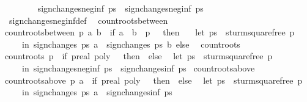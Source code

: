 \begin{isabellebody}
\ \ \ \ \ \ \isamarkupfalse%
\ {\isachardoublequoteopen}sign{\isacharunderscore}changes{\isacharunderscore}neg{\isacharunderscore}inf\ ps{\isacharprime}\ {\isacharequal}\ sign{\isacharunderscore}changes{\isacharunderscore}neg{\isacharunderscore}inf\ ps{\isachardoublequoteclose}\isanewline
\ \ \ \ \ \ \isamarkupfalse%
\ sign{\isacharunderscore}changes{\isacharunderscore}neg{\isacharunderscore}inf{\isacharunderscore}def\ \isacommand{{\isachardot}}\isamarkupfalse%
\isanewline
{}\isamarkupfalse%
%
\endisatagproof
{\isafoldproof}%
%
\isadelimproof
%
\endisadelimproof
%
\isamarkuptrue%
\isamarkupfalse%
\ count{\isacharunderscore}roots{\isacharunderscore}between\ \isanewline
{\isachardoublequoteopen}count{\isacharunderscore}roots{\isacharunderscore}between\ p\ a\ b\ {\isacharequal}\ {\isacharparenleft}if\ a\ {\isasymle}\ b\ {\isasymand}\ p\ {\isasymnoteq}\ {}\ then\ \isanewline
\ \ {\isacharparenleft}let\ ps\ {\isacharequal}\ sturm{\isacharunderscore}squarefree\ p\isanewline
\ \ \ \ in\ sign{\isacharunderscore}changes\ ps\ a\ {\isacharminus}\ sign{\isacharunderscore}changes\ ps\ b{\isacharparenright}\ else\ {}{\isacharparenright}{\isachardoublequoteclose}\isanewline
\isanewline
{}\isamarkupfalse%
\ count{\isacharunderscore}roots\ \isanewline
{\isachardoublequoteopen}count{\isacharunderscore}roots\ p\ {\isacharequal}\ {\isacharparenleft}if\ {\isacharparenleft}p{\isacharcolon}{\isacharcolon}real\ poly{\isacharparenright}\ {\isacharequal}\ {}\ then\ {}\ else\isanewline
\ \ {\isacharparenleft}let\ ps\ {\isacharequal}\ sturm{\isacharunderscore}squarefree\ p\isanewline
\ \ \ \ in\ sign{\isacharunderscore}changes{\isacharunderscore}neg{\isacharunderscore}inf\ ps\ {\isacharminus}\ sign{\isacharunderscore}changes{\isacharunderscore}inf\ ps{\isacharparenright}{\isacharparenright}{\isachardoublequoteclose}\isanewline
\isanewline
{}\isamarkupfalse%
\ count{\isacharunderscore}roots{\isacharunderscore}above\ \isanewline
{\isachardoublequoteopen}count{\isacharunderscore}roots{\isacharunderscore}above\ p\ a\ {\isacharequal}\ {\isacharparenleft}if\ {\isacharparenleft}p{\isacharcolon}{\isacharcolon}real\ poly{\isacharparenright}\ {\isacharequal}\ {}\ then\ {}\ else\isanewline
\ \ {\isacharparenleft}let\ ps\ {\isacharequal}\ sturm{\isacharunderscore}squarefree\ p\isanewline
\ \ \ \ in\ sign{\isacharunderscore}changes\ ps\ a\ {\isacharminus}\ sign{\isacharunderscore}changes{\isacharunderscore}inf\ ps{\isacharparenright}{\isacharparenright}{\isachardoublequoteclose}\isanewline

\end{isabellebody}

